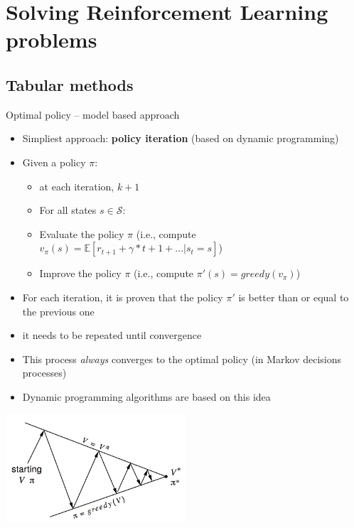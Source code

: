 \documentclass[presentation, 9pt]{beamer}\mode<presentation>{\usetheme{AMSBolognaFC}}
\begin{document}
\section{Solving Reinforcement Learning problems}
\subsection{Tabular methods}
\begin{frame}{Optimal policy -- model based approach}
\begin{itemize}
	\item Simpliest approach: \textbf{policy iteration} (based on dynamic programming)
	\item Given a policy $\pi$:
	\begin{itemize}
		\item at each iteration, $k+1$
		\item For all states $s \in \mathcal{S}$:
		\item Evaluate the policy $\pi$ (i.e., compute $v_{\pi}(s) = \mathbb{E}[r_{t+1} + \gamma * {t+1} + ... | s_t = s]$)
		\item Improve the policy $\pi$ (i.e., compute $\pi'(s) = greedy(v_\pi)$)
	\end{itemize}
	\item For each iteration, it is proven that the policy $\pi'$ is better than or equal to the previous one
	\item it needs to be repeated until convergence
	\item This process \emph{always} converges to the optimal policy (in Markov decisions processes)
	\item Dynamic programming algorithms are based on this idea
\end{itemize}
\centering
\includegraphics[width=0.5\textwidth]{img/policy-iteration.png}
\end{frame}
\end{document}
